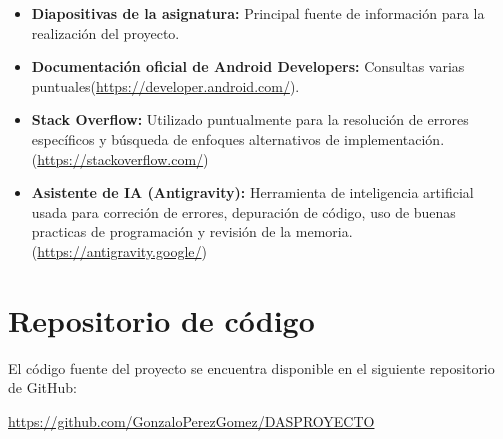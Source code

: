 \documentclass{article}
\begin{document}
\begin{itemize}
    \item \textbf{Diapositivas de la asignatura: } Principal fuente de información para la realización del proyecto.
    \item \textbf{Documentación oficial de Android Developers:} Consultas varias puntuales(\url{https://developer.android.com/}).
    \item \textbf{Stack Overflow:} Utilizado puntualmente para la resolución de errores específicos y búsqueda de enfoques alternativos de implementación.(\url{https://stackoverflow.com/})
    \item \textbf{Asistente de IA (Antigravity):} Herramienta de inteligencia artificial usada para correción de errores, depuración de código, uso de buenas practicas de programación y revisión de la memoria.(\url{https://antigravity.google/})
\end{itemize}

\section{Repositorio de código}

El código fuente del proyecto se encuentra disponible en el siguiente repositorio de GitHub:

\begin{center}
    \url{https://github.com/GonzaloPerezGomez/DASPROYECTO}
\end{center}
\end{document}
